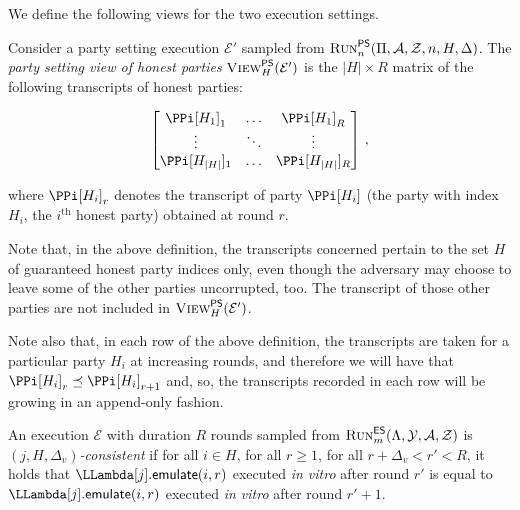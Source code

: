 We define the following views for the two execution settings.

\begin{definition}
  Consider a party setting execution $\mathcal{E}'$ sampled from
  $\textsc{Run}^{\textsf{PS}}_n(\Pi, \mathcal{A}, \mathcal{Z}, n, H, \Delta)$.
  The \emph{party setting view of honest parties} $\textsc{View}^{\textsf{PS}}_H(\mathcal{E}')$
  is the $|H|\times R$ matrix of the following transcripts of honest parties:

  \[
  \begin{bmatrix}
    \PPi[H_1]_1 &\ldots& \PPi[H_1]_R\\
         \vdots &\ddots& \vdots     \\
    \PPi[H_{|H|}]_1 &\ldots& \PPi[H_{|H|}]_R
  \end{bmatrix}\,,
  \]

  where $\PPi[H_i]_r$ denotes the transcript of party $\PPi[H_i]$
  (the party with index $H_i$, the $i^\text{th}$ honest party)
  obtained at round $r$.
\end{definition}

Note that, in the above definition, the transcripts concerned pertain to the
set $H$ of guaranteed honest party indices only, even though the adversary may choose
to leave some of the other parties uncorrupted, too. The transcript of
those other parties are not included in $\textsc{View}^{\textsf{PS}}_H(\mathcal{E}')$.

Note also that, in each row of the above definition, the transcripts
are taken for a particular party $H_i$ at increasing rounds, and therefore
we will have that $\PPi[H_i]_r \preceq \PPi[H_i]_{r+1}$ and, so, the transcripts
recorded in each row will be growing in an append-only fashion.

\begin{definition}
  An execution $\mathcal{E}$ with duration $R$ rounds sampled from
  $\textsc{Run}^{\textsf{ES}}_m(\Lambda, \mathcal{Y}, \mathcal{A}, \mathcal{Z})$
  is \emph{$(j,H,\Delta_v)$-\emph{consistent}} if
  for all $i \in H$, for all $r \geq 1$,
  for all $r + \Delta_v < r' < R$,
  it holds that
  $\LLambda[j].\emulateMachine(i, r)$ executed \emph{in vitro} after round $r'$
  is equal to
  $\LLambda[j].\emulateMachine(i, r)$ executed \emph{in vitro} after round $r' + 1$.
\end{definition}

